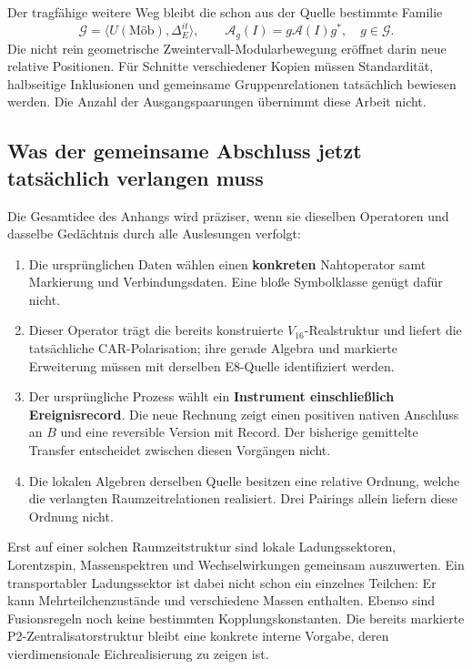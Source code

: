 Der tragfähige weitere Weg bleibt die schon aus der Quelle bestimmte Familie
\begin{equation}
\mathcal G=\langle U(\text{Möb}),\Delta_E^{it}\rangle,\qquad
\mathcal A_g(I)=g\mathcal A(I)g^*,\quad g\in\mathcal G.
\end{equation}
Die nicht rein geometrische Zweintervall-Modularbewegung eröffnet darin neue relative Positionen. Für Schnitte verschiedener Kopien müssen Standardität, halbseitige Inklusionen und gemeinsame Gruppenrelationen tatsächlich bewiesen werden. Die Anzahl der Ausgangspaarungen übernimmt diese Arbeit nicht.

\subsection{Was der gemeinsame Abschluss jetzt tatsächlich verlangen muss}
Die Gesamtidee des Anhangs wird präziser, wenn sie dieselben Operatoren und dasselbe Gedächtnis durch alle Auslesungen verfolgt:
\begin{enumerate}
\item Die ursprünglichen Daten wählen einen \textbf{konkreten} Nahtoperator samt Markierung und Verbindungsdaten. Eine bloße Symbolklasse genügt dafür nicht.
\item Dieser Operator trägt die bereits konstruierte $V_{16}$-Realstruktur und liefert die tatsächliche CAR-Polarisation; ihre gerade Algebra und markierte Erweiterung müssen mit derselben E8-Quelle identifiziert werden.
\item Der ursprüngliche Prozess wählt ein \textbf{Instrument einschließlich Ereignisrecord}. Die neue Rechnung zeigt einen positiven nativen Anschluss an $B$ und eine reversible Version mit Record. Der bisherige gemittelte Transfer entscheidet zwischen diesen Vorgängen nicht.
\item Die lokalen Algebren derselben Quelle besitzen eine relative Ordnung, welche die verlangten Raumzeitrelationen realisiert. Drei Pairings allein liefern diese Ordnung nicht.
\end{enumerate}
Erst auf einer solchen Raumzeitstruktur sind lokale Ladungssektoren, Lorentzspin, Massenspektren und Wechselwirkungen gemeinsam auszuwerten. Ein transportabler Ladungssektor ist dabei nicht schon ein einzelnes Teilchen: Er kann Mehrteilchenzustände und verschiedene Massen enthalten. Ebenso sind Fusionsregeln noch keine bestimmten Kopplungskonstanten. Die bereits markierte P2-Zentralisatorstruktur bleibt eine konkrete interne Vorgabe, deren vierdimensionale Eichrealisierung zu zeigen ist.


